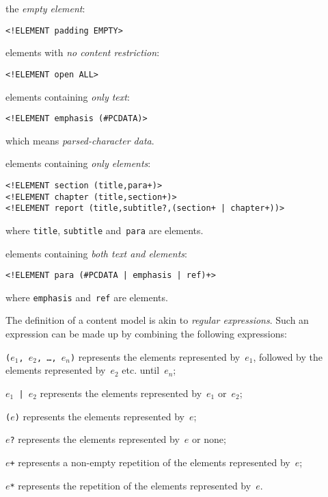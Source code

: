 \begin{enumerate*}

  \item the \emph{empty element}:
\begin{verbatim}
<!ELEMENT padding EMPTY>
\end{verbatim}

  \item elements with \emph{no content restriction}:
\begin{verbatim}
<!ELEMENT open ALL>
\end{verbatim}

  \item elements containing \emph{only text}:
\begin{verbatim}
<!ELEMENT emphasis (#PCDATA)>
\end{verbatim}
which means \emph{parsed\hyp{}character data}.

\bigskip

  \item elements containing \emph{only elements}:
\begin{verbatim}
<!ELEMENT section (title,para+)>
<!ELEMENT chapter (title,section+)>
<!ELEMENT report (title,subtitle?,(section+ | chapter+))>
\end{verbatim}
where \texttt{title}, \texttt{subtitle} and~\texttt{para} are
elements.

\bigskip

  \item elements containing \emph{both text and elements}:
\begin{verbatim}
<!ELEMENT para (#PCDATA | emphasis | ref)+>
\end{verbatim}
where \texttt{emphasis} and~\texttt{ref} are elements. 
\end{enumerate*}
The definition of a content model is akin to \emph{regular
  expressions}. Such an expression can be made up by combining the
following expressions:
\begin{itemize*}

  \item \texttt{(\(e_1\), \(e_2\), \dots, \(e_n\))} represents the
    elements represented by~\(e_1\), followed by the elements
    represented by~\(e_2\) etc. until~\(e_n\);

  \item \texttt{\(e_1\) | \(e_2\)} represents the elements represented
    by~\(e_1\) or~\(e_2\);

  \item \texttt{(\(e\))} represents the elements represented by~\(e\);

  \item \texttt{\(e\)?} represents the elements represented by~\(e\)
    or none;

  \item \texttt{\(e\)+} represents a non\hyp{}empty repetition of
    the elements represented by~\(e\);

  \item \texttt{\(e\)*} represents the repetition of the elements
    represented by~\(e\).

\end{itemize*}
